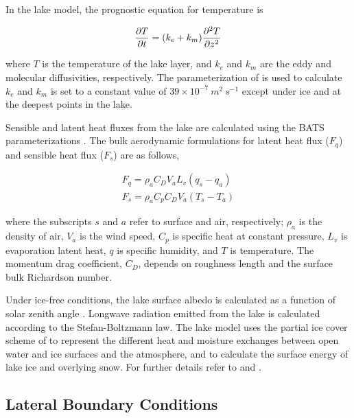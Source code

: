 {In the lake model, the prognostic equation for temperature is

\begin{eqnarray}
{\partial{T}\over \partial{t}} = (k_e + k_m) {\partial^2{T}\over \partial{z}^2 }
\end{eqnarray}

where $T$ is the temperature of the lake layer, and $k_e$ and $k_m$
are the eddy and molecular diffusivities, respectively.   The parameterization
of \cite{Henderson-Sellers_86} is used to calculate $k_e$ and $k_m$ is set to a
constant value of $39 \times 10^{-7}~m^2~s^{-1}$ except under ice and at the
deepest points in the lake.

Sensible and latent heat fluxes from the lake are calculated using  the BATS
parameterizations \cite{Dickinson_93}.  The bulk aerodynamic formulations for
latent heat flux ($F_q$) and sensible heat flux ($F_s$) are as follows,

\begin{eqnarray}
F_q = \rho_a C_D V_a L_v (q_s - q_a) \\ F_s = \rho_a C_p C_D V_a (T_s - T_a)
\end{eqnarray}

where the subscripts $s$ and $a$ refer to surface and air,
respectively; $\rho_a$ is the density of air, $V_a$ is the wind speed, $C_p$
is specific heat at constant pressure, $L_v$ is evaporation latent
heat, $q$ is specific humidity, and $T$ is temperature.  The momentum drag
coefficient, $C_D$, depends on roughness length and the surface bulk Richardson
number.

Under ice-free conditions, the lake surface albedo is calculated as a function
of solar zenith angle \cite{Henderson-Sellers_86}.  Longwave radiation emitted
from the lake is calculated according to the Stefan-Boltzmann law.  The lake
model uses the partial ice cover scheme of \cite{Patterson_88} to represent the
different heat and moisture exchanges between open water and ice surfaces and
the atmosphere, and to calculate the surface energy of lake ice and overlying
snow.  For further details refer to \cite{Hostetler_93} and \cite{Small_99b}. 

\subsection{Lateral Boundary Conditions}

}
